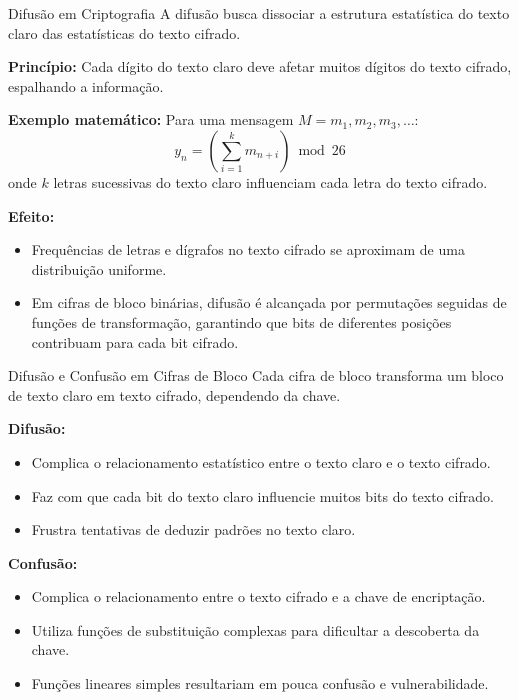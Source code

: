 \begin{frame}{Difusão em Criptografia}
A difusão busca dissociar a estrutura estatística do texto claro das estatísticas do texto cifrado.  

\medskip
\textbf{Princípio:} Cada dígito do texto claro deve afetar muitos dígitos do texto cifrado, espalhando a informação.  

\medskip
\textbf{Exemplo matemático:} Para uma mensagem $M = m_1, m_2, m_3, \dots$:
\[
y_n = \left( \sum_{i=1}^{k} m_{n+i} \right) \bmod 26
\]
onde $k$ letras sucessivas do texto claro influenciam cada letra do texto cifrado.  

\medskip
\textbf{Efeito:} 
\begin{itemize}
    \item Frequências de letras e dígrafos no texto cifrado se aproximam de uma distribuição uniforme.  
    \item Em cifras de bloco binárias, difusão é alcançada por permutações seguidas de funções de transformação, garantindo que bits de diferentes posições contribuam para cada bit cifrado.
\end{itemize}
\end{frame}

\begin{frame}{Difusão e Confusão em Cifras de Bloco}
Cada cifra de bloco transforma um bloco de texto claro em texto cifrado, dependendo da chave.  

\medskip
\textbf{Difusão:} 
\begin{itemize}
    \item Complica o relacionamento estatístico entre o texto claro e o texto cifrado.  
    \item Faz com que cada bit do texto claro influencie muitos bits do texto cifrado.  
    \item Frustra tentativas de deduzir padrões no texto claro.  
\end{itemize}

\medskip
\textbf{Confusão:} 
\begin{itemize}
    \item Complica o relacionamento entre o texto cifrado e a chave de encriptação.  
    \item Utiliza funções de substituição complexas para dificultar a descoberta da chave.  
    \item Funções lineares simples resultariam em pouca confusão e vulnerabilidade.  
\end{itemize}
\end{frame}

